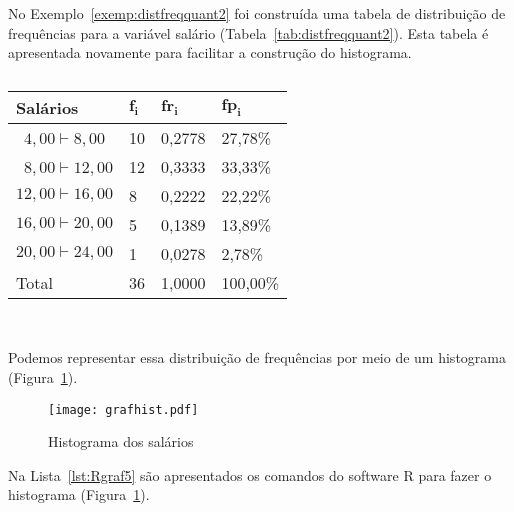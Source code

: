 \documentclass[11pt,fleqn]{book} %
\begin{document}
\begin{example}

No Exemplo~\ref{exemp:distfreqquant2} foi construída uma tabela de distribuição de frequências para a variável  salário (Tabela~\ref{tab:distfreqquant2}). Esta tabela é apresentada novamente para facilitar a construção do histograma. \\

\begin{table}[h!]
	\begin{rBox}
	\captionsetup{labelformat=empty}
	\caption{} 
	\centering
	{\color{olivine!130}\begin{tabular}{l l l l}
	\toprule
	\textbf{Salários} & $\bm{f_i}$ & $\bm{fr_i}$ & $\bm{fp_i}$ \\
	\midrule
	\,\,\,$4,00 \vdash 8,00$  &  10  &  0,2778  &  27,78\% \\
	\,\,\,$8,00 \vdash 12,00$  &  12  &  0,3333  &  33,33\% \\
	$12,00 \vdash 16,00$  &  8  &  0,2222  &  22,22\% \\
	$16,00 \vdash 20,00$  &  5  &  0,1389  &  13,89\% \\
	$20,00 \vdash 24,00$  &  1  &  0,0278  &  2,78\% \\	
	\hline
	Total  &  36  &  1,0000  &  100,00\% \\
	\bottomrule
	\end{tabular}} \\
	\end{rBox}
\end{table}

Podemos representar essa distribuição de frequências por meio de um histograma (Figura~\ref{fig:grafhist}). \\ 

\begin{figure}[h!]
\centering\texttt{[image: grafhist.pdf]}
\setlength{\abovecaptionskip}{0.5pt}
\caption{Histograma dos salários}
\label{fig:grafhist} %
\end{figure}

\end{example}


\vspace{0.3cm}

Na Lista~\ref{lst:Rgraf5} são apresentados os comandos do software R para fazer o histograma (Figura~\ref{fig:grafhist}).  \\
\end{document}
